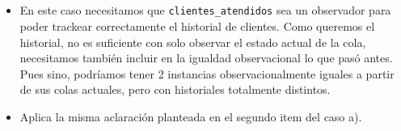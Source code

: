 \subsection{}

\begin{itemize}
    \item En este caso necesitamos que \lstinline{clientes_atendidos} sea un observador para poder trackear correctamente el historial de clientes. Como queremos el historial, no es suficiente con solo observar el estado actual de la cola, necesitamos también incluir en la igualdad observacional lo que pasó antes. Pues sino, podríamos tener 2 instancias observacionalmente iguales a partir de sus colas actuales, pero con historiales totalmente distintos.
    \item Aplica la misma aclaración planteada en el segundo item del caso a).
\end{itemize}
